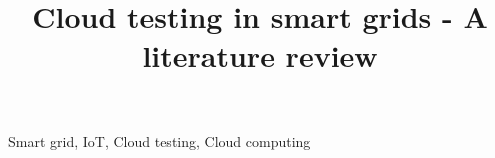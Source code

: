 \documentclass[conference]{biblio/IEEEtran}
\begin{document}
\title{Cloud testing in smart grids - A literature review\\}

\author{
}


\maketitle


\begin{IEEEkeywords}
Smart grid, IoT, Cloud testing, Cloud computing
\end{IEEEkeywords}











\vspace{12pt}
\end{document}
